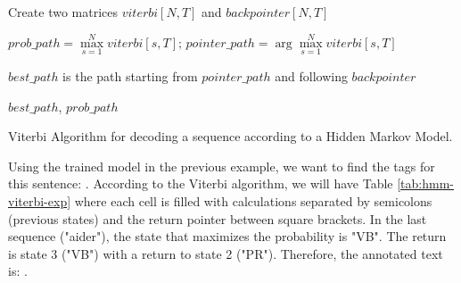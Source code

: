 \documentclass{KBook}
\begin{document}
\begin{algorithm}[ht]
	
	Create two matrices $viterbi[N, T]$ and $backpointer[N, T]$\;
	
	
	
	$prob\_path = \max\limits_{s=1}^N viterbi[s, T];\, pointer\_path = \arg\max\limits_{s=1}^N viterbi[s, T]$\;
	
	$best\_path$ is the path starting from $pointer\_path$ and following $backpointer$
	
	\Return $best\_path$, $prob\_path$\;
	\caption{Viterbi Algorithm for decoding a sequence according to a Hidden Markov Model.}
	\label{algo:viterbi}
\end{algorithm}

Using the trained model in the previous example, we want to find the tags for this sentence: . According to the Viterbi algorithm, we will have Table \ref{tab:hmm-viterbi-exp} where each cell is filled with calculations separated by semicolons (previous states) and the return pointer between square brackets. In the last sequence ("aider"), the state that maximizes the probability is "VB". The return is state 3 ("VB") with a return to state 2 ("PR"). Therefore, the annotated text is: .
\end{document}
